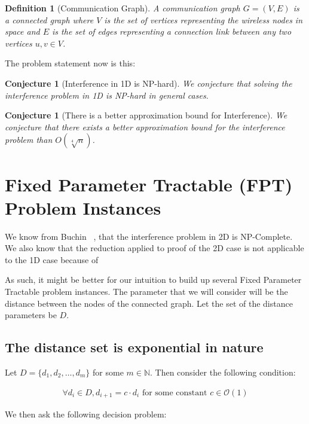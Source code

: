 \documentclass{article}
\makeatletter
\newtheorem{conjecture}[theorem]{Conjecture}
\newtheorem{definition}[theorem]{Definition}
\newcommand{\problemtitle}[1]{\gdef\@problemtitle{#1}}
\newcommand{\probleminput}[1]{\gdef\@probleminput{#1}}
\newcommand{\problemquestion}[1]{\gdef\@problemquestion{#1}}
\makeatother
\begin{document}
\begin{definition}[Communication Graph]
	A communication graph $G = (V, E)$ is a connected graph where $V$ is the set of vertices representing the wireless nodes in space and $E$ is the set of edges representing a connection link between any two vertices $u, v \in V$.
\end{definition}

The problem statement now is this:

\begin{conjecture}[Interference in 1D is NP-hard]
	We conjecture that solving the interference problem in 1D is NP-hard in general cases.
\end{conjecture}

\begin{conjecture}[There is a better approximation bound for Interference]
	We conjecture that there exists a better approximation bound for the interference problem than $O(\sqrt[4]{n})$.
\end{conjecture}


\section{Fixed Parameter Tractable (FPT) Problem Instances}
We know from Buchin ~\cite{buchin2011minimizing}, that the interference problem in 2D is NP-Complete. We also know that the reduction applied to proof of the 2D case is not applicable to the 1D case because of %

As such, it might be better for our intuition to build up several Fixed Parameter Tractable problem instances. The parameter that we will consider will be the distance between the nodes of the connected graph. Let the set of the distance parameters be $D$.

\subsection{The distance set is exponential in nature}
Let $D = \{	d_1, d_2, \dots, d_m\}$ for some $m \in \mathbb{N}$. Then consider the following condition:

\begin{align*}
	\forall d_i \in D, d_{i+1} = c \cdot d_i \text{ for some constant } c \in \mathcal{O}(1)
\end{align*}

\noindent We then ask the following decision problem:

\begin{problem}\label{prob:k_inter_min_1d}
\problemtitle{$k$\textsc{-interference minimization in 1D}}
\probleminput{Set of points $P$, distance set $D$, interference bound $k$}
\problemquestion{Is there a connected graph $G = (V, E)$ such that the interference of the graph is less than or equal to $k$?}
\end{problem}
\end{document}
